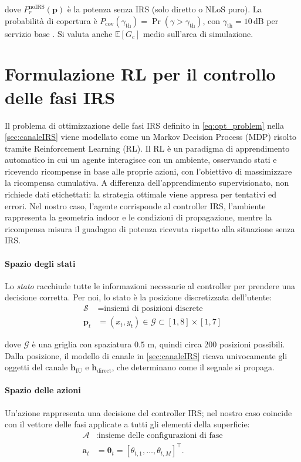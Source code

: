 \documentclass[12pt,a4paper]{report}
\begin{document}
dove $P_r^{\mathrm{noIRS}}(\mathbf{p})$ è la potenza senza IRS (solo
diretto o NLoS puro). La probabilità di copertura è
$P_{\mathrm{cov}}(\gamma_{\mathrm{th}}) = \Pr(\gamma >
\gamma_{\mathrm{th}})$, con $\gamma_{\mathrm{th}}=10\,$dB per
servizio base \cite{3gpp_tr38857}. Si valuta anche $\mathbb{E}[G_c]$
medio sull'area di simulazione.

\section{Formulazione RL per il controllo delle fasi IRS}
Il problema di ottimizzazione delle fasi IRS definito in
\eqref{eq:opt_problem} nella \cref{sec:canaleIRS} viene modellato
come un Markov Decision Process (MDP) risolto tramite Reinforcement
Learning (RL). Il RL è un paradigma di apprendimento automatico in
cui un agente interagisce con un ambiente, osservando stati e
ricevendo ricompense in base alle proprie azioni, con l'obiettivo di
massimizzare la ricompensa cumulativa. A differenza
dell'apprendimento supervisionato, non richiede dati etichettati: la
strategia ottimale viene appresa per tentativi ed errori. Nel nostro
caso, l'agente corrisponde al controller IRS, l'ambiente rappresenta
la geometria indoor e le condizioni di propagazione, mentre la
ricompensa misura il guadagno di potenza ricevuta rispetto alla
situazione senza IRS.

\paragraph{Spazio degli stati}
Lo \emph{stato} racchiude tutte le informazioni necessarie al
controller per prendere una decisione corretta. Per noi, lo stato è
la posizione discretizzata dell'utente:
\begin{align}
  \mathcal{S} &= \text{insiemi di posizioni discrete} \\
  \mathbf{p}_t &= (x_t, y_t) \in \mathcal{G} \subset [1,8] \times [1,7]
\end{align}

dove $\mathcal{G}$ è una griglia con spaziatura $0.5$ m, quindi circa
200 posizioni possibili. Dalla posizione, il modello di canale in
\cref{sec:canaleIRS} ricava univocamente gli oggetti del canale
$\mathbf{h}_{\mathrm{IU}}$ e $\mathbf{h}_{\mathrm{direct}}$, che
determinano come il segnale si propaga.

\paragraph{Spazio delle azioni}
Un'azione rappresenta una decisione del controller IRS; nel nostro
caso coincide con il vettore delle fasi applicate a tutti gli
elementi della superficie:
\begin{align}
  \mathcal{A} &: \text{insieme delle configurazioni di fase}\\
  \mathbf{a}_t &= \boldsymbol{\theta}_t =
  [\theta_{t,1}, \dots, \theta_{t,M}]^\top.
\end{align}
\end{document}
